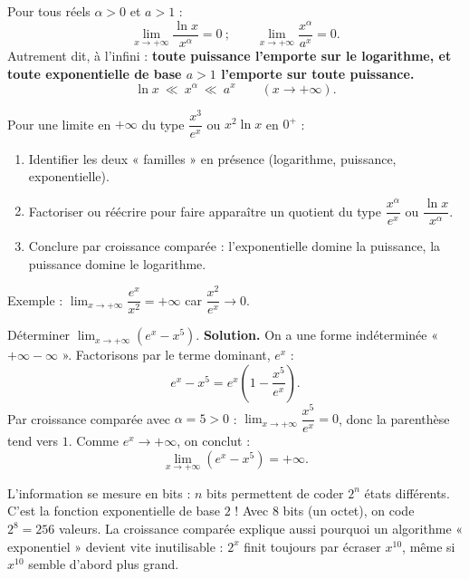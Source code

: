 \documentclass[11pt]{article}
\newcounter{popsec}
\newcounter{popsub}
\newcommand{\courssub}[1]{%
  \stepcounter{popsub}%
  \par\vspace{9pt}\noindent{\popxbold\fontsize{11.5}{13}\selectfont\color{popink}{\color{poporange}\thepopsec.\thepopsub}\hspace{6pt}#1}\par\nopagebreak\vspace{4pt}
}
\begin{document}
\courssub{Croissances comparées}

\begin{aretenir}
Pour tous réels $\alpha > 0$ et $a > 1$ :
\[ \lim_{x \to +\infty} \frac{\ln x}{x^{\alpha}} = 0 \ ; \qquad \lim_{x \to +\infty} \frac{x^{\alpha}}{a^x} = 0. \]
Autrement dit, à l'infini : \textbf{toute puissance l'emporte sur le logarithme, et toute exponentielle de base $a>1$ l'emporte sur toute puissance.}
\[ \ln x \ \ll\ x^{\alpha} \ \ll\ a^x \qquad (x \to +\infty). \]
\end{aretenir}

\begin{methode}
Pour une limite en $+\infty$ du type $\dfrac{x^3}{e^x}$ ou $x^2 \ln x$ en $0^+$ :
\begin{enumerate}
\item Identifier les deux « familles » en présence (logarithme, puissance, exponentielle).
\item Factoriser ou réécrire pour faire apparaître un quotient du type $\dfrac{x^{\alpha}}{e^x}$ ou $\dfrac{\ln x}{x^{\alpha}}$.
\item Conclure par croissance comparée : l'exponentielle domine la puissance, la puissance domine le logarithme.
\end{enumerate}
Exemple : $\lim_{x \to +\infty} \dfrac{e^x}{x^2} = +\infty$ car $\dfrac{x^2}{e^x} \to 0$.
\end{methode}

\begin{exoresolu}
Déterminer $\lim_{x \to +\infty} \left( e^x - x^5 \right)$.
\tcblower
\textbf{Solution.} On a une forme indéterminée « $+\infty - \infty$ ». Factorisons par le terme dominant, $e^x$ :
\[ e^x - x^5 = e^x \left( 1 - \frac{x^5}{e^x} \right). \]
Par croissance comparée avec $\alpha = 5 > 0$ : $\lim_{x \to +\infty} \dfrac{x^5}{e^x} = 0$, donc la parenthèse tend vers $1$. Comme $e^x \to +\infty$, on conclut :
\[ \lim_{x \to +\infty} \left( e^x - x^5 \right) = +\infty. \]
\end{exoresolu}

\begin{savaistu}
L'information se mesure en bits : $n$ bits permettent de coder $2^n$ états différents. C'est la fonction exponentielle de base $2$ ! Avec 8 bits (un octet), on code $2^8 = 256$ valeurs. La croissance comparée explique aussi pourquoi un algorithme « exponentiel » devient vite inutilisable : $2^x$ finit toujours par écraser $x^{10}$, même si $x^{10}$ semble d'abord plus grand.
\end{savaistu}
\end{document}
